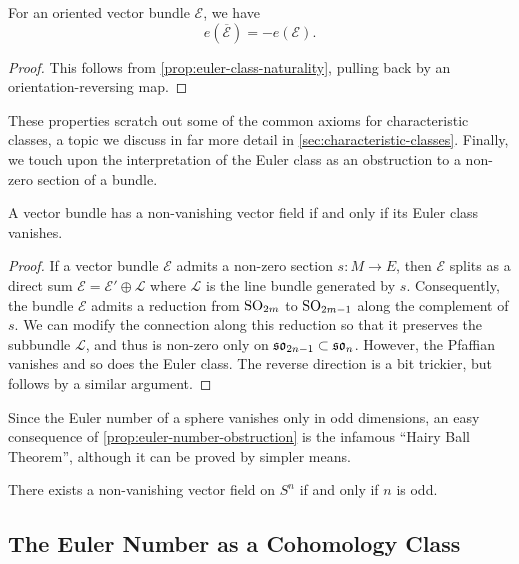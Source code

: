 \begin{proposition}
  For an oriented vector bundle $\mathcal{E}$, we have
  \[
    e(\overline{\mathcal{E}}) = -e(\mathcal{E}).
  \]
\end{proposition}
\begin{proof}
  This follows from \cref{prop:euler-class-naturality}, pulling back by an orientation-reversing map.
\end{proof}

These properties scratch out some of the common axioms for characteristic classes, a topic we discuss in far more detail in \cref{sec:characteristic-classes}. 
Finally, we touch upon the interpretation of the Euler class as an obstruction to a non-zero section of a bundle. 

\begin{proposition}\label{prop:euler-number-obstruction}
  A vector bundle has a non-vanishing vector field if and only if its Euler class vanishes.
\end{proposition}
\begin{proof}
If a vector bundle $\mathcal{E}$ admits a non-zero section $s : M \to E$, then $\mathcal{E}$ splits as a direct sum $\mathcal{E}=\mathcal{E}'\oplus \mathcal{L}$ where $\mathcal{L}$ is the line bundle generated by $s$. Consequently, the bundle $\mathcal{E}$ admits a reduction from $\mathrm{SO}_{2m}$ to $\mathrm{SO}_{2m-1}$ along the complement of $s$. We can modify the connection along this reduction so that it preserves the subbundle $\mathcal{L}$, and thus is non-zero only on $\mathfrak{so}_{2n-1}\subset \mathfrak{so}_n$. However, the Pfaffian vanishes and so does the Euler class. The reverse direction is a bit trickier, but follows by a similar argument.
\end{proof}


Since the Euler number of a sphere vanishes only in odd dimensions, an easy consequence of \cref{prop:euler-number-obstruction} is the infamous ``Hairy Ball Theorem'', although it can be proved by simpler means. 

\begin{theorem}
  There exists a non-vanishing vector field on $S^n$ if and only if $n$ is odd.
\end{theorem}

\subsection{The Euler Number as a Cohomology Class}\label{sec:euler-number-cohomology}

